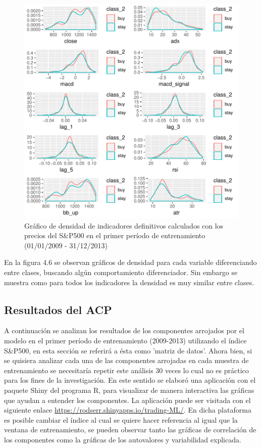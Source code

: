 \documentclass[a4paper,12pt]{Latex/Classes/PhDthesisPSnPDF}
\begin{document}
\begin{figure}[H]
\centering
\includegraphics{main-011}
\caption{Gráfico de densidad de indicadores definitivos calculados con los precios del S\&P500 en el primer período de entrenamiento (01/01/2009 - 31/12/2013)}
\end{figure}

En la figura 4.6 se observan gráficos de densidad para cada variable diferenciando entre clases, buscando algún comportamiento diferenciador. Sin embargo se muestra como para todos los indicadores la densidad es muy similar entre clases.

\subsection{Resultados del ACP}

A continuación se analizan los resultados de los componentes arrojados por el modelo en el primer período de entrenamiento (2009-2013) utilizando el índice S\&P500, en esta sección se referirá a ésta como 'matriz de datos'. Ahora bien, si se quisiera analizar cada una de las componentes arrojadas en cada muestra de entrenamiento se necesitaría repetir este análisis 30 veces lo cual no es práctico para los fines de la investigación. En este sentido se elaboró una aplicación con el paquete Shiny del programa R, para visualizar de manera interactiva las gráficas que ayudan a entender los componentes. La aplicación puede ser visitada con el siguiente enlace \url{https://rodserr.shinyapps.io/trading-ML/}. En dicha plataforma es posible cambiar el índice al cual se quiere hacer referencia al igual que la ventana de entrenamiento, se pueden observar tanto las gráficas de correlación de los componentes como la gráficas de los autovalores y variabilidad explicada.
\end{document}
